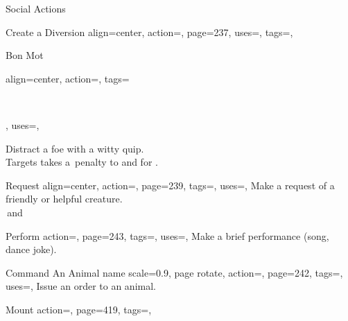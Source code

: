 \begin{PageBackLandscape}
\begin{TablesHalf}{\backTableHeight}
\begin{Table}{Social Actions}
\begin{entry}{Create a Diversion}{%
                align=center,
                action=,
                page=237,
                uses=\DeceptionPerception,
                tags=\Mental,
            }
            \end{entry}
            \begin{entry}{Bon Mot}{%
                align=center,
                action=,
                tags=\parbox{0.5\linewidth}{\raggedleft{}\,\Concentrate\\\Auditory\Linguistic},
                uses={\DiplomacyWill[tags={T}]\Feat},
            }
                Distract a foe with a witty quip. \Emotion\Mental\hfill {}\\
                Targets takes a \,\Status penalty to \PerceptionT and \WillT {} for .
                \hfill {}
            \end{entry}
            \breakLine
            \begin{entry}{Request}{%
                align=center,
                action=,
                page=239,
                tags=\Concentrate\Mental,
                uses=\Diplomacy,
            }
                Make a request of a friendly or helpful creature.\hfill {}\\
                \Auditory\,and \Linguistic\hfill{}\quad {}
            \end{entry}
            \begin{entry}{Perform}{%
                action=,
                page=243,
                tags=\Concentrate,
                uses=\Performance,
            }
                Make a brief performance (song, dance joke).\hfill{}\quad {}
            \end{entry}
            \breakLine
            \begin{entry}{Command An Animal}{%
                name scale=0.9,
                page rotate,
                action=\!,
                page=242,
                tags=\Concentrate,
                uses=\NatureWill,
            }
                Issue an order to an animal. \Auditory\hfill {}
            \end{entry}
            \begin{entry}{Mount}{%
                action=,
                page=419,
                tags=\Move,
            }

\end{entry}
\end{Table}
\end{TablesHalf}
\end{PageBackLandscape}
